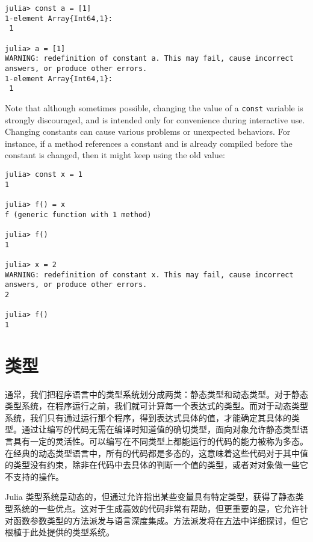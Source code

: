 \begin{verbatim}
julia> const a = [1]
1-element Array{Int64,1}:
 1

julia> a = [1]
WARNING: redefinition of constant a. This may fail, cause incorrect answers, or produce other errors.
1-element Array{Int64,1}:
 1
\end{verbatim}



Note that although sometimes possible, changing the value of a \texttt{const} variable is strongly discouraged, and is intended only for convenience during interactive use. Changing constants can cause various problems or unexpected behaviors. For instance, if a method references a constant and is already compiled before the constant is changed, then it might keep using the old value:




\begin{verbatim}
julia> const x = 1
1

julia> f() = x
f (generic function with 1 method)

julia> f()
1

julia> x = 2
WARNING: redefinition of constant x. This may fail, cause incorrect answers, or produce other errors.
2

julia> f()
1
\end{verbatim}



\hypertarget{2141690262982725665}{}


\chapter{类型}



通常，我们把程序语言中的类型系统划分成两类：静态类型和动态类型。对于静态类型系统，在程序运行之前，我们就可计算每一个表达式的类型。而对于动态类型系统，我们只有通过运行那个程序，得到表达式具体的值，才能确定其具体的类型。通过让编写的代码无需在编译时知道值的确切类型，面向对象允许静态类型语言具有一定的灵活性。可以编写在不同类型上都能运行的代码的能力被称为多态。在经典的动态类型语言中，所有的代码都是多态的，这意味着这些代码对于其中值的类型没有约束，除非在代码中去具体的判断一个值的类型，或者对对象做一些它不支持的操作。



Julia 类型系统是动态的，但通过允许指出某些变量具有特定类型，获得了静态类型系统的一些优点。这对于生成高效的代码非常有帮助，但更重要的是，它允许针对函数参数类型的方法派发与语言深度集成。方法派发将在\hyperlink{3842379394166369470}{方法}中详细探讨，但它根植于此处提供的类型系统。



